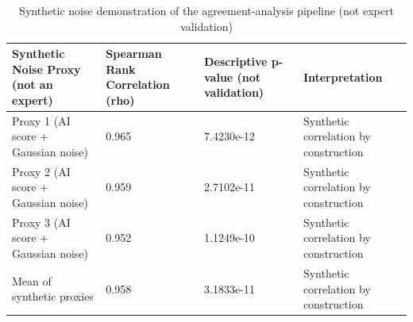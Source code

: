 \begin{table}
\caption{Synthetic noise demonstration of the agreement-analysis pipeline (not expert validation)}
\label{tab:simulated_agreement_demo}
\begin{tabular}{llll}
\toprule
Synthetic Noise Proxy (not an expert) & Spearman Rank Correlation (rho) & Descriptive p-value (not validation) & Interpretation \\
\midrule
Proxy 1 (AI score + Gaussian noise) & 0.965 & 7.4230e-12 & Synthetic correlation by construction \\
Proxy 2 (AI score + Gaussian noise) & 0.959 & 2.7102e-11 & Synthetic correlation by construction \\
Proxy 3 (AI score + Gaussian noise) & 0.952 & 1.1249e-10 & Synthetic correlation by construction \\
Mean of synthetic proxies & 0.958 & 3.1833e-11 & Synthetic correlation by construction \\
\bottomrule
\end{tabular}
\end{table}
